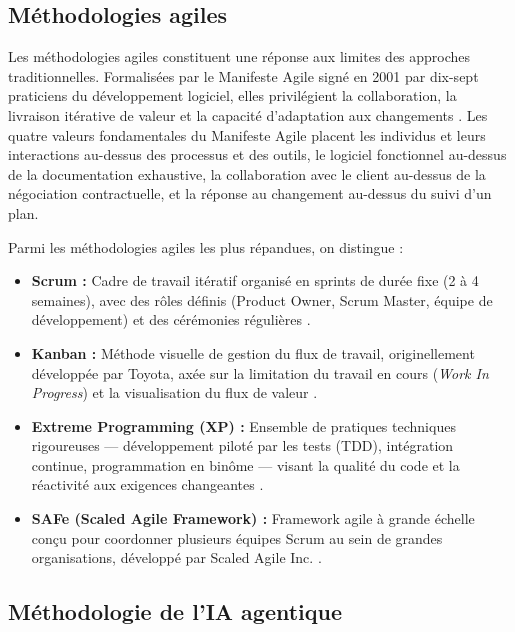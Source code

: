 \documentclass[12pt,a4paper]{report}
\begin{document}
\subsection{Méthodologies agiles}

Les méthodologies agiles constituent une réponse aux limites des approches traditionnelles. Formalisées par le Manifeste Agile signé en 2001 par dix-sept praticiens du développement logiciel, elles privilégient la collaboration, la livraison itérative de valeur et la capacité d'adaptation aux changements \cite{beck_agile}. Les quatre valeurs fondamentales du Manifeste Agile placent les individus et leurs interactions au-dessus des processus et des outils, le logiciel fonctionnel au-dessus de la documentation exhaustive, la collaboration avec le client au-dessus de la négociation contractuelle, et la réponse au changement au-dessus du suivi d'un plan.

Parmi les méthodologies agiles les plus répandues, on distingue :

\begin{itemize}[leftmargin=*, label=\textbullet]
    \item \textbf{Scrum :} Cadre de travail itératif organisé en sprints de durée fixe (2 à 4 semaines), avec des rôles définis (Product Owner, Scrum Master, équipe de développement) et des cérémonies régulières \cite{schwaber_scrum}.
    \item \textbf{Kanban :} Méthode visuelle de gestion du flux de travail, originellement développée par Toyota, axée sur la limitation du travail en cours (\textit{Work In Progress}) et la visualisation du flux de valeur \cite{anderson_kanban}.
    \item \textbf{Extreme Programming (XP) :} Ensemble de pratiques techniques rigoureuses --- développement piloté par les tests (TDD), intégration continue, programmation en binôme --- visant la qualité du code et la réactivité aux exigences changeantes \cite{beck_xp}.
    \item \textbf{SAFe (Scaled Agile Framework) :} Framework agile à grande échelle conçu pour coordonner plusieurs équipes Scrum au sein de grandes organisations, développé par Scaled Agile Inc. \cite{leffingwell_safe}.
\end{itemize}

\subsection{Méthodologie de l'IA agentique}
\end{document}
